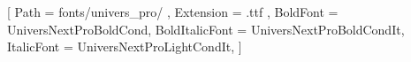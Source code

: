 %
%
%
%
%
%
%

%
%



\usepackage[T1]{fontenc}         %
\usepackage[utf8]{inputenc}      %

%
\usepackage{fontspec}

\setmainfont{UniversNextProLightCond}[
   Path = fonts/univers_pro/ ,
   Extension = .ttf ,
   BoldFont = UniversNextProBoldCond,
   BoldItalicFont = UniversNextProBoldCondIt,
   ItalicFont = UniversNextProLightCondIt,
]

